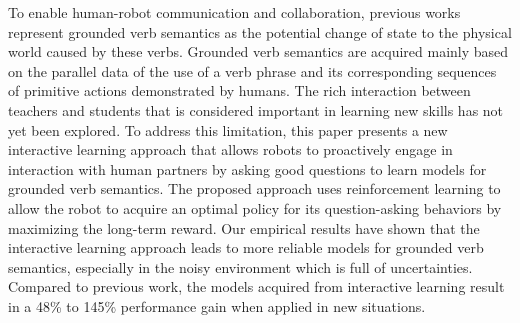 To enable human-robot communication and collaboration, previous works represent grounded verb semantics as the potential change of state to the physical world caused by these verbs. Grounded verb semantics are acquired mainly based on the parallel data of the use of a verb phrase and its corresponding sequences of primitive actions demonstrated by humans. The rich interaction between teachers and students that is considered important in learning new skills has not yet been explored. To address this limitation, this paper presents a new interactive learning approach that allows robots to proactively engage in interaction with human partners by asking good questions to learn models for grounded verb semantics. The proposed approach uses reinforcement learning to allow the robot to acquire an optimal policy for its question-asking behaviors by maximizing the long-term reward. Our empirical results have shown that the interactive learning approach leads to more reliable models for grounded verb semantics, especially in the noisy environment which is full of uncertainties. Compared to previous work, the models acquired from interactive learning result in a 48\% to 145\% performance gain when applied in new situations.
